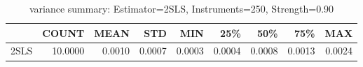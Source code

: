 \begin{table}[ht]
\centering
\caption{variance summary: Estimator=2SLS, Instruments=250, Strength=0.90}
\begin{tabular}{lrrrrrrrr}
\toprule
 & COUNT & MEAN & STD & MIN & 25\% & 50\% & 75\% & MAX \\
\midrule
2SLS & 10.0000 & 0.0010 & 0.0007 & 0.0003 & 0.0004 & 0.0008 & 0.0013 & 0.0024 \\
\bottomrule
\end{tabular}
\end{table}
